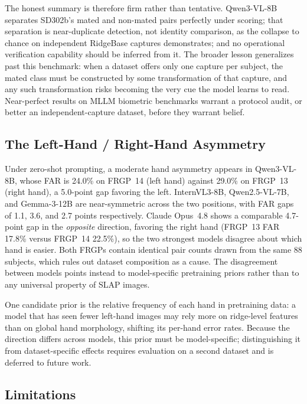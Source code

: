 \documentclass[journal]{IEEEtran}
\begin{document}
The honest summary is therefore firm rather than tentative. Qwen3-VL-8B
separates SD302b's mated and non-mated pairs perfectly under scoring; that
separation is near-duplicate detection, not identity comparison, as the
collapse to chance on independent RidgeBase captures demonstrates; and no
operational verification capability should be inferred from it. The broader
lesson generalizes past this benchmark: when a dataset offers only one capture
per subject, the mated class must be constructed by some transformation of that
capture, and any such transformation risks becoming the very cue the model
learns to read. Near-perfect results on MLLM biometric benchmarks warrant a
protocol audit, or better an independent-capture dataset, before they
warrant belief.

\subsection{The Left-Hand / Right-Hand Asymmetry}

Under zero-shot prompting, a moderate hand asymmetry appears in
Qwen3-VL-8B, whose FAR is 24.0\% on FRGP~14 (left hand) against 29.0\% on
FRGP~13 (right hand), a 5.0-point gap favoring the left.
InternVL3-8B, Qwen2.5-VL-7B, and Gemma-3-12B are near-symmetric across the
two positions, with FAR gaps of 1.1, 3.6, and 2.7 points respectively.
Claude Opus~4.8 shows a comparable 4.7-point gap in the \emph{opposite}
direction, favoring the right hand (FRGP~13 FAR 17.8\% versus FRGP~14
22.5\%), so the two strongest models disagree about which hand is easier.
Both FRGPs contain identical pair counts drawn from the same 88 subjects,
which rules out dataset composition as a cause. The disagreement between
models points instead to model-specific pretraining priors rather than to
any universal property of SLAP images.

One candidate prior is the relative frequency of each hand in
pretraining data: a model that has seen fewer left-hand images may rely
more on ridge-level features than on global hand morphology, shifting its
per-hand error rates. Because the direction differs across models, this
prior must be model-specific; distinguishing it from dataset-specific
effects requires evaluation on a second dataset and is deferred to future
work.

\subsection{Limitations}
\label{sec:limitations}
\end{document}
